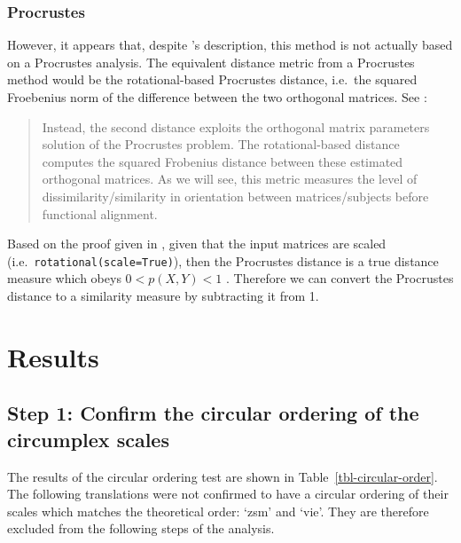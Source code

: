 \documentclass[
  authoryear,
  preprint,
  3p]{elsarticle}
\begin{document}
\subsubsection{Procrustes}\label{procrustes}

However, it appears that, despite \citet{Rogoza2021three} 's
description, this method is not actually based on a Procrustes analysis.
The equivalent distance metric from a Procrustes method would be the
rotational-based Procrustes distance, i.e.~the squared Froebenius norm
of the difference between the two orthogonal matrices. See
\citet{Andreella2023Procrustes}:

\begin{quote}
Instead, the second distance exploits the orthogonal matrix parameters
solution of the Procrustes problem. The rotational-based distance
computes the squared Frobenius distance between these estimated
orthogonal matrices. As we will see, this metric measures the level of
dissimilarity/similarity in orientation between matrices/subjects before
functional alignment.
\end{quote}

Based on the proof given in \citet{Baktiar2015symmetrical}, given that
the input matrices are scaled (i.e.~\texttt{rotational(scale=True)}),
then the Procrustes distance is a true distance measure which obeys
\(0 < p(X, Y) < 1\) \citep[322]{Bakhtiar2015symmetrical}. Therefore we
can convert the Procrustes distance to a similarity measure by
subtracting it from 1.

\section{Results}\label{results}

\subsection{Step 1: Confirm the circular ordering of the circumplex
scales}\label{step-1-confirm-the-circular-ordering-of-the-circumplex-scales-1}

The results of the circular ordering test are shown in
Table~\ref{tbl-circular-order}. The following translations were not
confirmed to have a circular ordering of their scales which matches the
theoretical order: `zsm' and `vie'. They are therefore excluded from the
following steps of the analysis.
\end{document}
